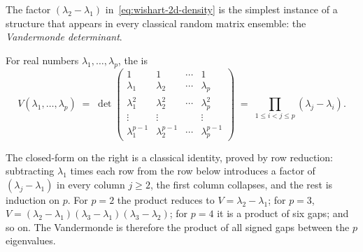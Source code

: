 The factor \((\lambda_2 - \lambda_1)\) in~\eqref{eq:wishart-2d-density} is the simplest instance of a structure that appears in every classical random matrix ensemble: the \emph{Vandermonde determinant}.

\begin{definition}\label{def:vandermonde}
For real numbers \(\lambda_1, \ldots, \lambda_p\), the  is
\begin{equation}
  V(\lambda_1, \ldots, \lambda_p)
  \;=\;
  \det\!\begin{pmatrix}
    1               & 1               & \cdots & 1               \\
    \lambda_1       & \lambda_2       & \cdots & \lambda_p       \\
    \lambda_1^2     & \lambda_2^2     & \cdots & \lambda_p^2     \\
    \vdots          & \vdots          &        & \vdots          \\
    \lambda_1^{p-1} & \lambda_2^{p-1} & \cdots & \lambda_p^{p-1}
  \end{pmatrix}
  \;=\;
  \prod_{1 \le i < j \le p} (\lambda_j - \lambda_i).
  \label{eq:vandermonde}
\end{equation}
\end{definition}

The closed-form on the right is a classical identity, proved by row reduction: subtracting \(\lambda_1\) times each row from the row below introduces a factor of \((\lambda_j - \lambda_1)\) in every column \(j \ge 2\), the first column collapses, and the rest is induction on \(p\). For \(p = 2\) the product reduces to \(V = \lambda_2 - \lambda_1\); for \(p = 3\), \(V = (\lambda_2 - \lambda_1)(\lambda_3 - \lambda_1)(\lambda_3 - \lambda_2)\); for \(p = 4\) it is a product of six gaps; and so on. The Vandermonde is therefore the product of all signed gaps between the \(p\) eigenvalues.

